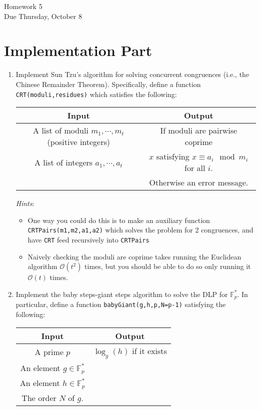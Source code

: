 \documentclass[11pt]{article}
\newcommand{\bF}{\mathbb{F}}
\newcommand{\cO}{\mathcal{O}}
\begin{document}
\begin{center}
\Large {Homework 5}\\
\small {Due Thursday, October 8}
\end{center}
\section*{Implementation Part}
\begin{enumerate}
  \item{
  Implement Sun Tzu's algorithm for solving concurrent congruences (i.e., the Chinese Remainder Theorem).  Specifically, define a function \verb|CRT(moduli,residues)| which satisfies the following:
  \begin{center}
    \begin{tabular}{c|c}
      Input & Output\\
      \hline
      A list of moduli $m_1,\cdots,m_t$ (positive integers) & If moduli are pairwise coprime\\
      A list of integers $a_1,\cdots,a_t$ &$x$ satisfying $x\equiv a_i\mod m_i$ for all $i$.\\
      &Otherwise an error message.
    \end{tabular}
  \end{center}
  \textit{Hints}:
  \begin{itemize}
    \item{One way you could do this is to make an auxiliary function \verb|CRTPairs(m1,m2,a1,a2)| which solves the problem for 2 congruences, and have \verb|CRT| feed recursively into \verb|CRTPairs|}
    \item{
    Naively checking the moduli are coprime takes running the Euclidean algorithm $\cO(t^2)$ times, but you should be able to do so only running it $\cO(t)$ times.
    }
  \end{itemize}
  }
  \item{
  Implement the baby steps-giant steps algorithm to solve the DLP for $\bF_p^*$.  In particular, define a function \verb|babyGiant(g,h,p,N=p-1)| satisfying the following:
  \begin{center}
    \begin{tabular}{c|c}
      Input & Output\\
      \hline
      A prime $p$ & $\log_g(h)$ if it exists\\
      An element $g\in\bF_p^*$ & \\
      An element $h\in\bF_p^*$ & \\
      The order $N$ of $g$.
    \end{tabular}

\end{center}}
\end{enumerate}
\end{document}
